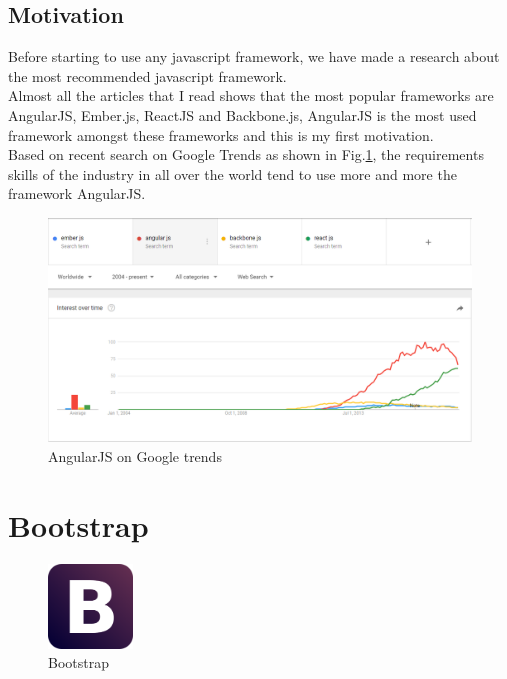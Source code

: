 	\subsection{Motivation}
	Before starting to use any javascript framework, we have made a research about the most recommended javascript framework.
	\\
	Almost all the articles that I read shows that the most popular frameworks are \colorbox{mygray}{AngularJS}, \colorbox{mygray}{Ember.js}, \colorbox{mygray}{ReactJS} and \colorbox{mygray}{Backbone.js}, AngularJS is the most used framework amongst these frameworks and this is my first motivation.\\
    Based on recent search on Google Trends as shown in Fig.\ref{AngularJSOnGoogleTrends}, the requirements skills  of the industry in all over the world tend  to use more and more the framework AngularJS.
	 	\begin{figure}[h]
	 	\centering
	 	\includegraphics[width=1.0\textwidth]{AngularJS_statics_google_trends.png}
	 	\caption{AngularJS on Google trends}
	 	\label{AngularJSOnGoogleTrends}
	 \end{figure}
	 

\clearpage
\newpage

	\section{Bootstrap}
	\begin{figure}[h]
		\centering
		\includegraphics[width=0.20\textwidth]{Boostrap_logo.png}
		\caption{Bootstrap}
	\end{figure}
